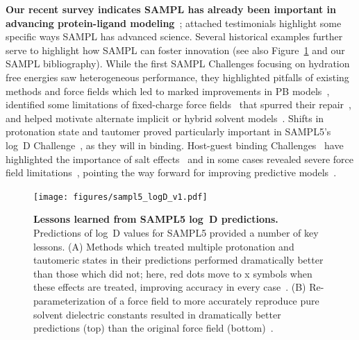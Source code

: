 \documentclass[11pt]{article}
\begin{document}
\textbf{Our recent survey indicates SAMPL has already been important in advancing protein-ligand modeling}~\cite{Mobley:2017:eScholarship}; attached testimonials highlight some specific ways SAMPL has advanced science.
Several historical examples further serve to highlight how SAMPL can foster innovation (see also Figure~\ref{figure:sampl5_logD} and our SAMPL bibliography). 
While the first SAMPL Challenges focusing on hydration free energies saw heterogeneous performance, they highlighted pitfalls of existing methods and force fields which led to marked improvements in PB models~\cite{nicholls_samp1_2009, ellingson_analysis_2010,ellingson_efficient_2014}, identified some limitations of fixed-charge force fields~\cite{mobley_alchemical_2012, Fennell:2014:J.Phys.Chem.B} that spurred their repair~\cite{mobley_alchemical_2012, Fennell:2014:J.Phys.Chem.B, paranahewage_predicting_2016},
and helped motivate alternate implicit or hybrid solvent models~\cite{sulea_predicting_2011, li_testing_2014, brini_adapting_2016}.
Shifts in protonation state and tautomer proved particularly important in SAMPL5's log~D Challenge~\cite{Bannan:2016:JComputAidedMolDes, klamt_prediction_2016}, as they will in binding.
Host-guest binding Challenges~\cite{Mobley:2017:AnnualReviewofBiophysics}
have highlighted the importance of salt effects~\cite{yin_overview_2016, muddana_blind_2014, Mobley:2017:AnnualReviewofBiophysics}
and in some cases revealed severe force field limitations~\cite{yin_sampl5_2016, muddana_sampl4_2014-1}, pointing the way forward for improving predictive models~\cite{yin_toward_2015, Mobley:2017:AnnualReviewofBiophysics}.


\begin{figure}
\vspace{-0.25in}
\begin{centering}
\texttt{[image: figures/sampl5\_logD\_v1.pdf]}

\end{centering}
\footnotesize
\caption{\label{figure:sampl5_logD}  
\textbf{Lessons learned from SAMPL5 log~D predictions.} 
Predictions of log~D values for SAMPL5 provided a number of key lessons. (A) Methods which treated multiple protonation and tautomeric states in their predictions performed dramatically better than those which did not; here, red dots move to x symbols when these effects are treated, improving accuracy in every case~\cite{Pickard:2016:JComputAidedMolDes}. (B) Re-parameterization of a force field to more accurately reproduce pure solvent dielectric constants resulted in dramatically better predictions (top) than the original force field (bottom)~\cite{paranahewage_predicting_2016}. 
}
\end{figure}
\end{document}
